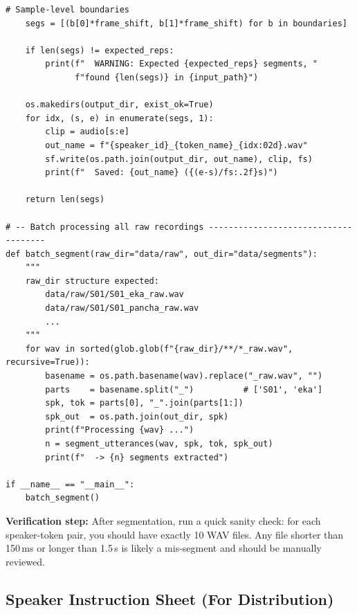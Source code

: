 \documentclass[12pt,a4paper]{article}
\begin{document}
\begin{lstlisting}[caption={Audio segmentation script using energy-based VAD.},
                   label={lst:segment}]
    # Sample-level boundaries
    segs = [(b[0]*frame_shift, b[1]*frame_shift) for b in boundaries]

    if len(segs) != expected_reps:
        print(f"  WARNING: Expected {expected_reps} segments, "
              f"found {len(segs)} in {input_path}")

    os.makedirs(output_dir, exist_ok=True)
    for idx, (s, e) in enumerate(segs, 1):
        clip = audio[s:e]
        out_name = f"{speaker_id}_{token_name}_{idx:02d}.wav"
        sf.write(os.path.join(output_dir, out_name), clip, fs)
        print(f"  Saved: {out_name} ({(e-s)/fs:.2f}s)")

    return len(segs)

# -- Batch processing all raw recordings -------------------------------------
def batch_segment(raw_dir="data/raw", out_dir="data/segments"):
    """
    raw_dir structure expected:
        data/raw/S01/S01_eka_raw.wav
        data/raw/S01/S01_pancha_raw.wav
        ...
    """
    for wav in sorted(glob.glob(f"{raw_dir}/**/*_raw.wav", recursive=True)):
        basename = os.path.basename(wav).replace("_raw.wav", "")
        parts    = basename.split("_")          # ['S01', 'eka']
        spk, tok = parts[0], "_".join(parts[1:])
        spk_out  = os.path.join(out_dir, spk)
        print(f"Processing {wav} ...")
        n = segment_utterances(wav, spk, tok, spk_out)
        print(f"  -> {n} segments extracted")

if __name__ == "__main__":
    batch_segment()
\end{lstlisting}

\begin{notebox}
\textbf{Verification step:} After segmentation, run a quick sanity check:
for each speaker-token pair, you should have exactly 10 WAV files.
Any file shorter than 150\,ms or longer than 1.5\,s is likely a mis-segment
and should be manually reviewed.
\end{notebox}

\subsection{Speaker Instruction Sheet (For Distribution)}
\end{document}
